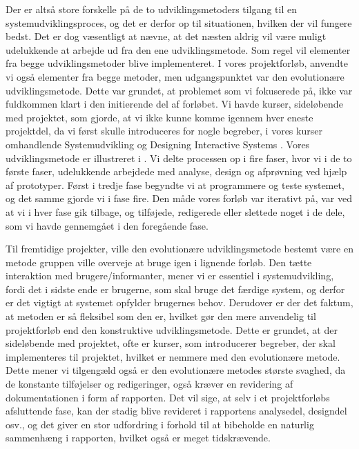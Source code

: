 Der er altså store forskelle på de to udviklingsmetoders tilgang til en systemudviklingsproces, og det er derfor op til situationen, hvilken der vil fungere bedst. Det er dog væsentligt at nævne, at det næsten aldrig vil være muligt udelukkende at arbejde ud fra den ene udviklingsmetode. Som regel vil elementer fra begge udviklingsmetoder blive implementeret. I vores projektforløb, anvendte vi også elementer fra begge metoder, men udgangspunktet var den evolutionære udviklingsmetode. Dette var grundet, at problemet som vi fokuserede på, ikke var fuldkommen klart i den initierende del af forløbet. Vi havde kurser, sideløbende med projektet, som gjorde, at vi ikke kunne komme igennem hver eneste projektdel, da vi først skulle introduceres for nogle begreber, i vores kurser omhandlende Systemudvikling \cite{ooad} og Designing Interactive Systems \cite{deb}. Vores udviklingsmetode er illustreret i . Vi delte processen op i fire faser, hvor vi i de to første faser, udelukkende arbejdede med analyse, design og afprøvning ved hjælp af prototyper. Først i tredje fase begyndte vi at programmere og teste systemet, og det samme gjorde vi i fase fire. Den måde vores forløb var iterativt på, var ved at vi i hver fase gik tilbage, og tilføjede, redigerede eller slettede noget i de dele, som vi havde gennemgået i den foregående fase.

Til fremtidige projekter, ville den evolutionære udviklingsmetode bestemt være en metode gruppen ville overveje at bruge igen i lignende forløb. Den tætte interaktion med brugere/informanter, mener vi er essentiel i systemudvikling, fordi det i sidste ende er brugerne, som skal bruge det færdige system, og derfor er det vigtigt at systemet opfylder brugernes behov. Derudover er der det faktum, at metoden er så fleksibel som den er, hvilket gør den mere anvendelig til projektforløb end den konstruktive udviklingsmetode. Dette er grundet, at der sideløbende med projektet, ofte er kurser, som introducerer begreber, der skal implementeres til projektet, hvilket er nemmere med den evolutionære metode. Dette mener vi tilgengæld også er den evolutionære metodes største svaghed, da de konstante tilføjelser og redigeringer, også kræver en revidering af dokumentationen i form af rapporten. Det vil sige, at selv i et projektforløbs afsluttende fase, kan der stadig blive revideret i rapportens analysedel, designdel osv., og det giver en stor udfordring i forhold til at bibeholde en naturlig sammenhæng i rapporten, hvilket også er meget tidskrævende.

